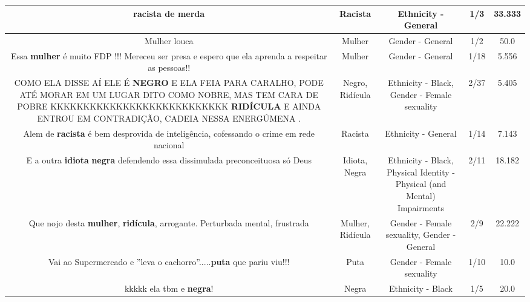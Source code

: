 \documentclass[11pt]{article}
\newlength\mylength
\begin{document}
\begin{center}
\begin{longtable}{|C{.65\mylength}|C{.30\mylength}|C{.12\mylength}|C{.12\mylength}|C{.12\mylength}|}
  \small racista de merda\normalsize   & Racista & Ethnicity - General & 1/3 & 33.333 \\  \hline
  \small Mulher louca\normalsize   & Mulher & Gender - General & 1/2 & 50.0 \\  \hline
  \small Essa \textbf{mulher} é muito FDP !!! Mereceu ser presa e espero que ela aprenda a respeitar as pessoas!!\normalsize   & Mulher & Gender - General & 1/18 & 5.556 \\  \hline
  \small COMO ELA DISSE AÍ ELE É \textbf{NEGRO} E ELA FEIA PARA CARALHO, PODE ATÉ MORAR EM UM LUGAR DITO COMO NOBRE, MAS TEM CARA DE POBRE KKKKKKKKKKKKKKKKKKKKKKKKKKK \textbf{RIDÍCULA} E AINDA ENTROU EM CONTRADIÇÃO, CADEIA NESSA ENERGÚMENA .\normalsize   & Negro, Ridícula & Ethnicity - Black, Gender - Female sexuality & 2/37 & 5.405 \\  \hline
  \small Alem de \textbf{racista} é bem desprovida de inteligência, cofessando o crime em rede nacional\normalsize   & Racista & Ethnicity - General & 1/14 & 7.143 \\  \hline
  \small E  a outra \textbf{idiota} \textbf{negra} defendendo essa dissimulada preconceituosa só Deus\normalsize   & Idiota, Negra & Ethnicity - Black, Physical Identity - Physical (and Mental) Impairments & 2/11 & 18.182 \\  \hline
  \small Que nojo desta \textbf{mulher}, \textbf{ridícula}, arrogante. Perturbada mental, frustrada\normalsize   & Mulher, Ridícula & Gender - Female sexuality, Gender - General & 2/9 & 22.222 \\  \hline
  \small Vai ao Supermercado e ''leva o cachorro''.....\textbf{puta} que pariu viu!!!\normalsize   & Puta & Gender - Female sexuality & 1/10 & 10.0 \\  \hline
  \small kkkkk ela tbm e \textbf{negra}!\normalsize   & Negra & Ethnicity - Black & 1/5 & 20.0 \\  \hline

\end{longtable}
\end{center}
\end{document}

